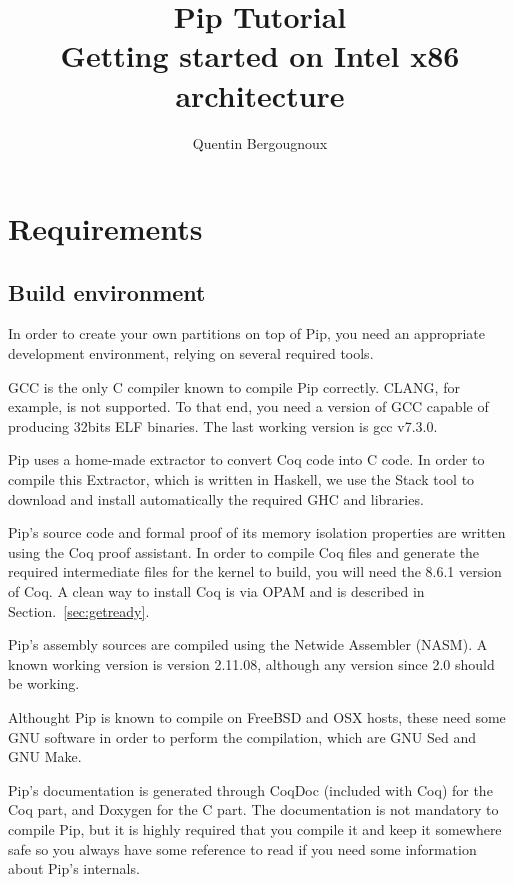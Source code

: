 \documentclass[10pt,a4paper,titlepage]{refart}
\author{Quentin Bergougnoux}
\title{Pip Tutorial \\ Getting started on Intel x86 architecture}
\begin{document}
\maketitle
\tableofcontents
{}
\lstlistoflistings
\pagebreak
\section{Requirements}
\subsection{Build environment}
In order to create your own partitions on top of Pip, you need an appropriate development environment, relying on several required tools.

GCC is the only C compiler known to compile Pip correctly. CLANG, for example, is not supported. To that end, you need a version of GCC capable of producing 32bits ELF binaries. The last working version is gcc v7.3.0.

Pip uses a home-made extractor to convert Coq code into C code. In order to compile this Extractor, which is written in Haskell, we use the Stack tool to download and install automatically the required GHC and libraries.

Pip's source code and formal proof of its memory isolation properties are written
using the Coq proof assistant. In order to compile Coq files and
generate the required intermediate files for the kernel to build, you will need the 8.6.1 version of Coq.  A clean way to install Coq is via OPAM and is described in Section.~\ref{sec:getready}.

Pip's assembly sources are compiled using the Netwide Assembler (NASM). A known working version is version 2.11.08, although any version since 2.0 should be working.

Althought Pip is known to compile on FreeBSD and OSX hosts, these need some GNU software in order to perform the compilation, which are GNU Sed and GNU Make. 

Pip's documentation is generated through CoqDoc (included with Coq) for the Coq part, and Doxygen for the C part. The documentation is not mandatory to compile Pip, but it is highly required that you compile it and keep it somewhere safe so you always have some reference to read if you need some information about Pip's internals.
\end{document}
